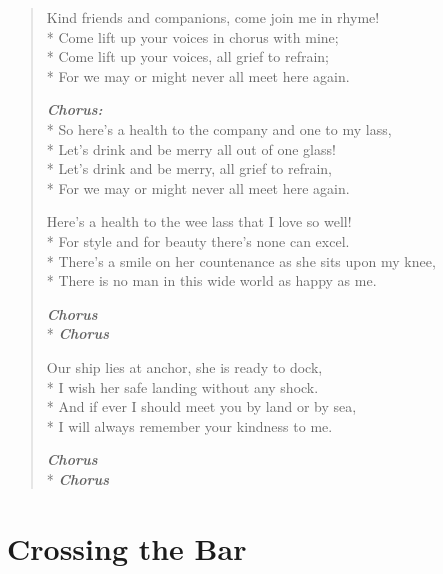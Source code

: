 \documentclass[9pt,twoside]{extarticle}
\makeatletter
\newenvironment{xverse}{
	\begin{verse}
	\fontsize{8.5}{10.5}\selectfont
}{
	\end{verse}
}
\newcommand{\chorusdef}{\textbf{\emph{Chorus:}}\\*}
\newcommand{\chorus@mark}[1][1]{%
\textbf{\emph{Chorus \ifthenelse{\equal{#1}{1}}{}{$\times$ #1}}}%
}
\newcommand{\chorusmark}[1][1]{%
\ifvmode%
\vspace{-0.5\stanzaskip}%
\chorus@mark[#1]%
\vspace{-0.5\stanzaskip}%
\else \\*%
\chorus@mark[#1]%
\fi%
}
\makeatother
\begin{document}
\begin{xverse}
Kind friends and companions, come join me in rhyme! \\*
Come lift up your voices in chorus with mine; \\*
Come lift up your voices, all grief to refrain; \\*
For we may or might never all meet here again.

\chorusdef
So here’s a health to the company and one to my lass, \\*
Let’s drink and be merry all out of one glass! \\*
Let’s drink and be merry, all grief to refrain, \\*
For we may or might never all meet here again.

Here’s a health to the wee lass that I love so well! \\*
For style and for beauty there’s none can excel. \\*
There’s a smile on her countenance as she sits upon my knee, \\*
There is no man in this wide world as happy as me.

\chorusmark

Our ship lies at anchor, she is ready to dock, \\*
I wish her safe landing without any shock. \\*
And if ever I should meet you by land or by sea, \\*
I will always remember your kindness to me.

\chorusmark
\end{xverse}

\section{Crossing the Bar}
\end{document}
